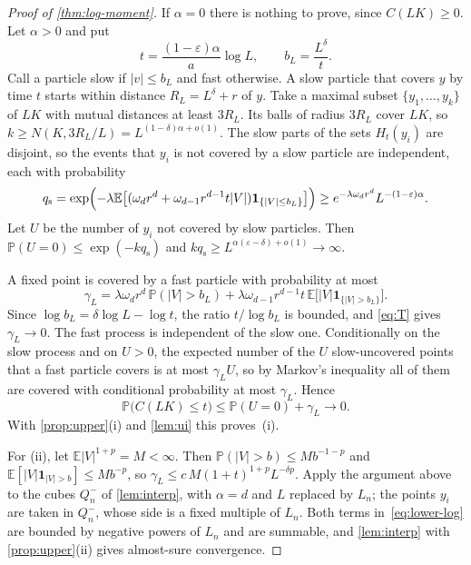 \documentclass[11pt,a4paper]{article}
\numberwithin{equation}{section}
\theoremstyle{definition}
\theoremstyle{remark}
\newcommand{\E}{\mathbb E}
\newcommand{\Pp}{\mathbb P}
\newcommand{\ind}{\mathbf 1}
\newcommand{\abs}[1]{\lvert#1\rvert}
\begin{document}
\begin{proof}[Proof of \cref{thm:log-moment}]
If $\alpha=0$ there is nothing to prove, since $C(LK)\ge0$. Let $\alpha>0$
and put
\[
t=\frac{(1-\varepsilon)\alpha}{a}\log L,\qquad b_L=\frac{L^\delta}{t}.
\]
Call a particle slow if $\abs v\le b_L$ and fast otherwise. A slow particle
that covers $y$ by time $t$ starts within distance $R_L=L^\delta+r$ of $y$.
Take a maximal subset $\{y_1,\dots,y_k\}$ of $LK$ with mutual distances at
least $3R_L$. Its balls of radius $3R_L$ cover $LK$, so
$k\ge N(K,3R_L/L)=L^{(1-\delta)\alpha+o(1)}$. The slow parts of the sets
$H_t(y_i)$ are disjoint, so the events that $y_i$ is not covered by a slow
particle are independent, each with probability
\[
q_{\mathrm s}=\exp\Bigl(-\lambda\E\bigl[(\omega_dr^d+\omega_{d-1}r^{d-1}t\abs V)\ind_{\{\abs V\le b_L\}}\bigr]\Bigr)
\ge e^{-\lambda\omega_dr^d}L^{-(1-\varepsilon)\alpha}.
\]
Let $U$ be the number of $y_i$ not covered by slow particles. Then
$\Pp(U=0)\le\exp(-kq_{\mathrm s})$ and
$kq_{\mathrm s}\ge L^{\alpha(\varepsilon-\delta)+o(1)}\to\infty$.

A fixed point is covered by a fast particle with probability at most
\begin{equation}\label{eq:gamma}
\gamma_L=\lambda\omega_dr^d\,\Pp(\abs V>b_L)
+\lambda\omega_{d-1}r^{d-1}t\,\E\bigl[\abs V\ind_{\{\abs V>b_L\}}\bigr].
\end{equation}
Since $\log b_L=\delta\log L-\log t$, the ratio $t/\log b_L$ is bounded, and
\eqref{eq:T} gives $\gamma_L\to0$. The fast process is independent of the slow
one. Conditionally on the slow process and on $U>0$, the expected number of
the $U$ slow-uncovered points that a fast particle covers is at most
$\gamma_LU$, so by Markov's inequality all of them are covered with
conditional probability at most $\gamma_L$. Hence
\begin{equation}\label{eq:lower-log}
\Pp\bigl(C(LK)\le t\bigr)\le\Pp(U=0)+\gamma_L\to0 .
\end{equation}
With \cref{prop:upper}(i) and \cref{lem:ui} this proves~(i).

For (ii), let $\E\abs V^{1+p}=M<\infty$. Then
$\Pp(\abs V>b)\le Mb^{-1-p}$ and $\E[\abs V\ind_{\abs V>b}]\le Mb^{-p}$,
so $\gamma_L\le c\,M(1+t)^{1+p}L^{-\delta p}$. Apply the argument above to
the cubes $Q_n^-$ of \cref{lem:interp}, with $\alpha=d$ and $L$ replaced by
$L_n$; the points $y_i$ are taken in $Q_n^-$, whose side is a fixed multiple
of $L_n$. Both terms in~\eqref{eq:lower-log} are bounded by negative powers of
$L_n$ and are summable, and \cref{lem:interp} with \cref{prop:upper}(ii)
gives almost-sure convergence.
\end{proof}
\end{document}
